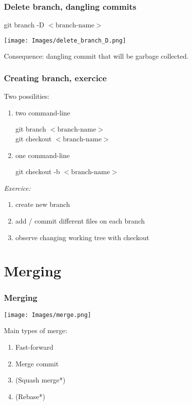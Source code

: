 \documentclass{beamer}
\begin{document}
	\begin{frame}[plain]
		\frametitle{Delete branch, dangling commits}
		

		\begin{center}
			git branch -D $<\text{branch-name}>$
		\end{center}
		
		\begin{center}
			\texttt{[image: Images/delete\_branch\_D.png]}
		\end{center}

		Consequence: dangling commit that will be garbage collected.
	\end{frame}

	\begin{frame}[plain]
		\frametitle{Creating branch, exercice}
		
		Two possilities:
		\begin{enumerate}
			\item two command-line
				\begin{center}
					git branch $<\text{branch-name}>$ \\
					git checkout $<\text{branch-name}>$
				\end{center}
			\item one command-line
				\begin{center}
					git checkout -b $<\text{branch-name}>$
				\end{center}
		\end{enumerate}
	
		\textit{Exercice:}
		\begin{enumerate}
			\item create new branch
			\item add / commit different files on each branch 
			\item observe changing working tree with checkout
		\end{enumerate}
	
	\end{frame}

	\section{Merging}

	\begin{frame}[plain]
		\frametitle{Merging}
		\begin{center}
			\texttt{[image: Images/merge.png]}
		\end{center}
		
		Main types of merge:
		\begin{enumerate}
			\item Fast-forward
			\item Merge commit
			\item (Squash merge*)
			\item (Rebase*)
		\end{enumerate}
	
	\end{frame}
\end{document}
